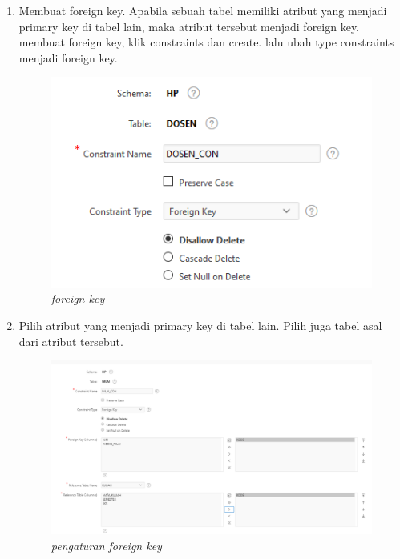 \begin{enumerate}
    \item Membuat foreign key. Apabila sebuah tabel memiliki atribut yang menjadi primary key di tabel lain, maka atribut tersebut menjadi foreign key. membuat foreign key, klik constraints dan create. lalu ubah type constraints menjadi foreign key. 
    
    \newpage
    \begin{figure}[!htbp]
        \centering
        \includegraphics[scale=0.7]{figure/foreign_key.PNG}
        \caption{\textit{foreign key}}
        \label{fig:my_label}
    \end{figure}
    
    \item Pilih atribut yang menjadi primary key di tabel lain. Pilih juga tabel asal dari atribut tersebut.
    
    \begin{figure}[!htbp]
        \centering
        \includegraphics[scale=0.5]{figure/pengaturan_foreign_key.PNG}
        \caption{\textit{pengaturan foreign key}}
        \label{fig:my_label}
    \end{figure}
    

\end{enumerate}
